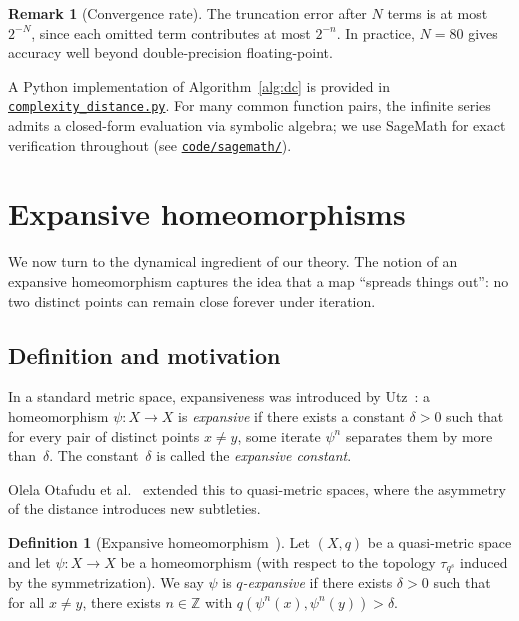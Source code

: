 \documentclass[11pt,a4paper]{article}
\newcommand{\repourl}{https://github.com/guydev42/expansive-homeomorphisms-complexity-qmetric}
\theoremstyle{plain}
\theoremstyle{definition}
\newtheorem{definitioninner}[theoreminner]{Definition}
\newtheorem{remarkinner}[theoreminner]{Remark}
\newenvironment{definition}[1][]{\begin{definitioninner}[#1]}{\end{definitioninner}}
\newenvironment{remark}[1][]{\begin{remarkinner}[#1]}{\end{remarkinner}}
\newcommand{\Z}{\mathbb{Z}}
\begin{document}
\begin{remark}[Convergence rate]
The truncation error after $N$ terms is at most $2^{-N}$, since each
omitted term contributes at most $2^{-n}$.  In practice, $N=80$ gives
accuracy well beyond double-precision floating-point.
\end{remark}

A Python implementation of Algorithm~\ref{alg:dc} is provided in
\href{\repourl/blob/main/code/python/complexity_distance.py}{\texttt{complexity\_distance.py}}.
For many common function pairs, the infinite series admits a
closed-form evaluation via symbolic algebra; we use SageMath for
exact verification throughout (see
\href{\repourl/tree/main/code/sagemath}{\texttt{code/sagemath/}}).


\section{Expansive homeomorphisms}
\label{sec:expansive}

We now turn to the dynamical ingredient of our theory.
The notion of an expansive homeomorphism captures the idea that a
map ``spreads things out'': no two distinct points can remain close
forever under iteration.

\subsection{Definition and motivation}

In a standard metric space, expansiveness was introduced by
Utz~\cite{utz1950}: a homeomorphism $\psi\colon X\to X$ is
\emph{expansive} if there exists a constant $\delta>0$ such that for
every pair of distinct points $x\neq y$, some iterate $\psi^n$
separates them by more than~$\delta$.  The constant~$\delta$ is
called the \emph{expansive constant}.

Olela Otafudu et al.~\cite{olela2024} extended this to
quasi-metric spaces, where the asymmetry of the distance introduces
new subtleties.

\begin{definition}[Expansive homeomorphism~\cite{olela2024}]
\label{def:expansive}
Let $(X,q)$ be a quasi-metric space and let $\psi\colon X\to X$ be a
homeomorphism (with respect to the topology $\tau_{q^s}$ induced by
the symmetrization).  We say $\psi$ is \emph{$q$-expansive} if there
exists $\delta>0$ such that for all $x\neq y$, there exists $n\in\Z$
with $q(\psi^n(x),\psi^n(y))>\delta$.
\end{definition}
\end{document}
